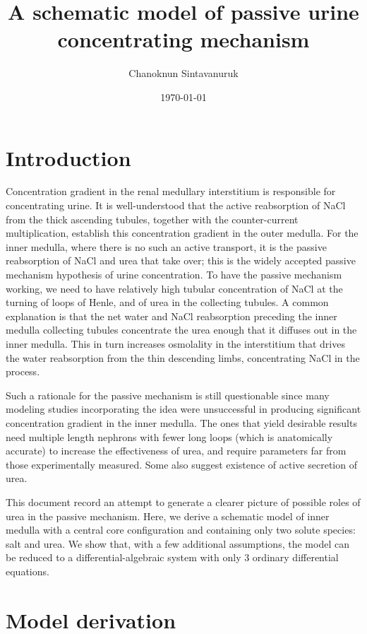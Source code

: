 \documentclass{article}
\title{A schematic model of passive urine concentrating mechanism}
\author[1]{Chanoknun Sintavanuruk}
\date{\today}
\begin{document}
\sloppy %
\maketitle

\section{Introduction}

Concentration gradient in the renal medullary interstitium is responsible for concentrating urine.
It is well-understood that the active reabsorption of NaCl from the thick ascending tubules, together with the counter-current multiplication, establish this concentration gradient in the outer medulla.
For the inner medulla, where there is no such an active transport, it is the passive reabsorption of NaCl and urea that take over; this is the widely accepted passive mechanism hypothesis of urine concentration.
To have the passive mechanism working, we need to have relatively high tubular concentration of NaCl at the turning of loops of Henle, and of urea in the collecting tubules.
A common explanation is that the net water and NaCl reabsorption preceding the inner medulla collecting tubules concentrate the urea enough that it diffuses out in the inner medulla.
This in turn increases osmolality in the interstitium that drives the water reabsorption from the thin descending limbs, concentrating NaCl in the process.

Such a rationale for the passive mechanism is still questionable since many modeling studies incorporating the idea were unsuccessful in producing significant concentration gradient in the inner medulla.
The ones that yield desirable results need multiple length nephrons with fewer long loops (which is anatomically accurate) to increase the effectiveness of urea, and require parameters far from those experimentally measured.
Some also suggest existence of active secretion of urea.

This document record an attempt to generate a clearer picture of possible roles of urea in the passive mechanism.
Here, we derive a schematic model of inner medulla with a central core configuration and containing only two solute species: salt and urea.
We show that, with a few additional assumptions, the model can be reduced to a differential-algebraic system with only 3 ordinary differential equations.

\section{Model derivation}
\end{document}
